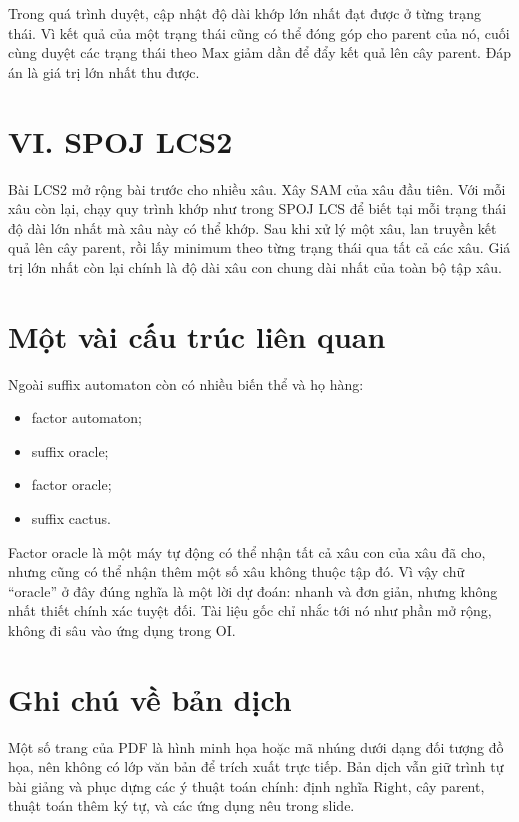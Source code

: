 \documentclass[11pt]{article}
\begin{document}
Trong quá trình duyệt, cập nhật độ dài khớp lớn nhất đạt được ở từng trạng
thái.  Vì kết quả của một trạng thái cũng có thể đóng góp cho parent của nó,
cuối cùng duyệt các trạng thái theo $\mathrm{Max}$ giảm dần để đẩy kết quả lên
cây parent.  Đáp án là giá trị lớn nhất thu được.

\section{VI. SPOJ LCS2}

Bài LCS2 mở rộng bài trước cho nhiều xâu.  Xây SAM của xâu đầu tiên.  Với mỗi
xâu còn lại, chạy quy trình khớp như trong SPOJ LCS để biết tại mỗi trạng thái
độ dài lớn nhất mà xâu này có thể khớp.  Sau khi xử lý một xâu, lan truyền kết
quả lên cây parent, rồi lấy minimum theo từng trạng thái qua tất cả các xâu.
Giá trị lớn nhất còn lại chính là độ dài xâu con chung dài nhất của toàn bộ tập
xâu.

\section{Một vài cấu trúc liên quan}

Ngoài suffix automaton còn có nhiều biến thể và họ hàng:
\begin{itemize}
  \item factor automaton;
  \item suffix oracle;
  \item factor oracle;
  \item suffix cactus.
\end{itemize}

Factor oracle là một máy tự động có thể nhận tất cả xâu con của xâu đã cho,
nhưng cũng có thể nhận thêm một số xâu không thuộc tập đó.  Vì vậy chữ
``oracle'' ở đây đúng nghĩa là một lời dự đoán: nhanh và đơn giản, nhưng không
nhất thiết chính xác tuyệt đối.  Tài liệu gốc chỉ nhắc tới nó như phần mở rộng,
không đi sâu vào ứng dụng trong OI.

\section{Ghi chú về bản dịch}

Một số trang của PDF là hình minh họa hoặc mã nhúng dưới dạng đối tượng đồ
họa, nên không có lớp văn bản để trích xuất trực tiếp.  Bản dịch vẫn giữ trình
tự bài giảng và phục dựng các ý thuật toán chính: định nghĩa
$\mathrm{Right}$, cây parent, thuật toán thêm ký tự, và các ứng dụng nêu trong
slide.
\end{document}
